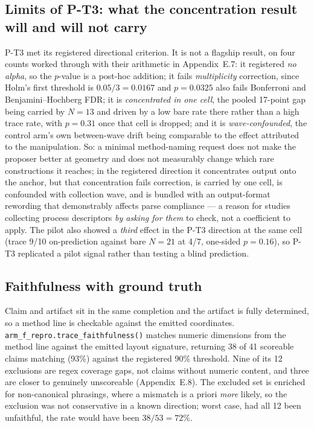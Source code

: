 \subsection{Limits of P-T3: what the concentration result will and will not carry}

P-T3 met its registered directional criterion. It is not a flagship result, on four counts worked
through with their arithmetic in Appendix~E.7: it registered \emph{no alpha}, so the $p$-value is a
post-hoc addition; it fails \emph{multiplicity} correction, since Holm's first threshold is
$0.05/3 = 0.0167$ and $p = 0.0325$ also fails Bonferroni and Benjamini--Hochberg FDR; it is
\emph{concentrated in one cell}, the pooled 17-point gap being carried by $N = 13$ and driven by a
low bare rate there rather than a high trace rate, with $p = 0.31$ once that cell is dropped; and
it is \emph{wave-confounded}, the control arm's own between-wave drift being comparable to the
effect attributed to the manipulation. So: a minimal method-naming request does not make the
proposer better at geometry and does not measurably change which rare constructions it reaches; in
the registered direction it concentrates output onto the anchor, but that concentration fails
correction, is carried by one cell, is confounded with collection wave, and is bundled with an
output-format rewording that demonstrably affects parse compliance --- a reason for studies
collecting process descriptors \emph{by asking for them} to check, not a coefficient to apply. The
pilot also showed a \emph{third} effect in the P-T3 direction at the same cell (trace 9/10
on-prediction against bare $N = 21$ at 4/7, one-sided $p = 0.16$), so P-T3 replicated a pilot signal
rather than testing a blind prediction.

\subsection{Faithfulness with ground truth}

Claim and artifact sit in the same completion and the artifact is fully determined, so a method
line is checkable against the emitted coordinates. \texttt{arm\_f\_repro.trace\_faithfulness()}
matches numeric dimensions from the method line against the emitted layout signature, returning 38
of 41 scoreable claims matching (93\%) against the registered 90\% threshold. Nine of its 12
exclusions are regex coverage gaps, not claims without numeric content, and three are closer to
genuinely unscoreable (Appendix~E.8). The excluded set is enriched for non-canonical phrasings,
where a mismatch is a priori \emph{more} likely, so the exclusion was not conservative in a known
direction; worst case, had all 12 been unfaithful, the rate would have been $38/53 = 72\%$.

